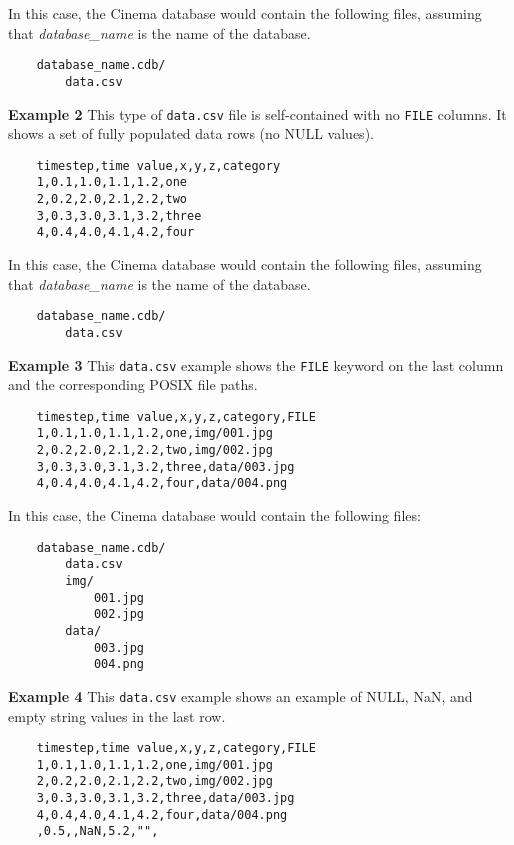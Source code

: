 \noindent
In this case, the Cinema database would contain the following files,
assuming that {\em database\_name} is the name of the database.

\begin{verbatim}
    database_name.cdb/
        data.csv
\end{verbatim}

\noindent
\textbf{Example 2} This type of \texttt{\small data.csv} file is 
self-contained with no \texttt{\small FILE} columns. It shows a set of fully
populated data rows (no NULL values).

\begin{verbatim}
    timestep,time value,x,y,z,category
    1,0.1,1.0,1.1,1.2,one
    2,0.2,2.0,2.1,2.2,two
    3,0.3,3.0,3.1,3.2,three
    4,0.4,4.0,4.1,4.2,four
\end{verbatim}

\noindent
In this case, the Cinema database would contain the following files,
assuming that {\em database\_name} is the name of the database.

\begin{verbatim}
    database_name.cdb/
        data.csv
\end{verbatim}

\noindent
\textbf{Example 3} This \texttt{\small data.csv} example shows the 
\texttt{\small FILE} keyword on the last column and the corresponding
POSIX file paths.

\begin{verbatim}
    timestep,time value,x,y,z,category,FILE
    1,0.1,1.0,1.1,1.2,one,img/001.jpg
    2,0.2,2.0,2.1,2.2,two,img/002.jpg
    3,0.3,3.0,3.1,3.2,three,data/003.jpg
    4,0.4,4.0,4.1,4.2,four,data/004.png 
\end{verbatim}

\noindent
In this case, the Cinema database would contain the following files:

\begin{verbatim}
    database_name.cdb/
        data.csv
        img/
            001.jpg
            002.jpg
        data/
            003.jpg
            004.png
\end{verbatim}

\noindent
\textbf{Example 4} This \texttt{\small data.csv} example shows an example
of NULL, NaN, and empty string values in the last row.

\begin{verbatim}
    timestep,time value,x,y,z,category,FILE
    1,0.1,1.0,1.1,1.2,one,img/001.jpg
    2,0.2,2.0,2.1,2.2,two,img/002.jpg
    3,0.3,3.0,3.1,3.2,three,data/003.jpg
    4,0.4,4.0,4.1,4.2,four,data/004.png 
    ,0.5,,NaN,5.2,"",
\end{verbatim}

